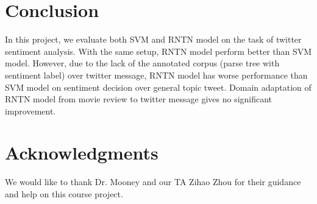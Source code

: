 \section{Conclusion}
\label{sec:conclusion}
In this project, we evaluate both SVM and RNTN model on the task of twitter sentiment analysis. With the same setup, RNTN model perform better than SVM model. However, due to the lack of the annotated corpus (parse tree with sentiment label) over twitter message, RNTN model has worse performance than  SVM model on sentiment decision over general topic tweet. Domain adaptation of RNTN model from movie review to twitter message gives no significant improvement. 




 

\section*{Acknowledgments}
We would like to thank Dr. Mooney and our TA Zihao Zhou for their guidance and help on this course project. 